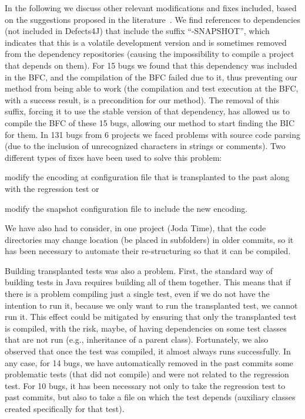 In the following we discuss other relevant modifications and fixes included, based on the suggestions proposed in the literature~\cite{maes2022revisiting}.
We find references to dependencies (not included in Defects4J) that include the suffix ``-SNAPSHOT'', which indicates that this is a volatile development version and is sometimes removed from the dependency repositories (causing the impossibility to compile a project that depends on them). 
For 15 bugs we found that this dependency was included in the BFC, and the compilation of the BFC failed due to it, thus preventing our method from being able to work (the compilation and test execution at the BFC, with a success result, is a precondition for our method). 
The removal of this suffix, forcing it to use the stable version of that dependency, has allowed us to compile the BFC of these 15 bugs, allowing our method to start finding the BIC for them.
In 131 bugs from 6 projects we faced problems with source code parsing (due to the inclusion of unrecognized characters in strings or comments). 
Two different types of fixes have been used to solve this problem: 
\begin{inparaenum}[\bf(1)]
    \item modify the encoding at configuration file that is transplanted to the past along with the regression test or
    \item modify the snapshot configuration file to include the new encoding.
\end{inparaenum} 
We have also had to consider, in one project (Joda Time), that the code directories may change location (be placed in subfolders) in older commits, so it has been necessary to automate their re-structuring so that it can be compiled.

Building transplanted tests was also a problem. First, the standard way of building tests in Java requires building all of them together. 
This means that if there is a problem compiling just a single test, even if we do not have the intention to run it, because we only want to run the transplanted test, we cannot run it. 
This effect could be mitigated by ensuring that only the transplanted test is compiled, with the risk, maybe, of having dependencies on some test classes that are not run (e.g., inheritance of a parent class). Fortunately, we also observed that once the test was compiled, it almost always runs successfully.
In any case, for 14 bugs, we have automatically removed in the past commits some problematic tests (that did not compile) and were not related to the regression test.
For 10 bugs, it has been necessary not only to take the regression test to past commits, but also to take a file on which the test depends (auxiliary classes created specifically for that test).

